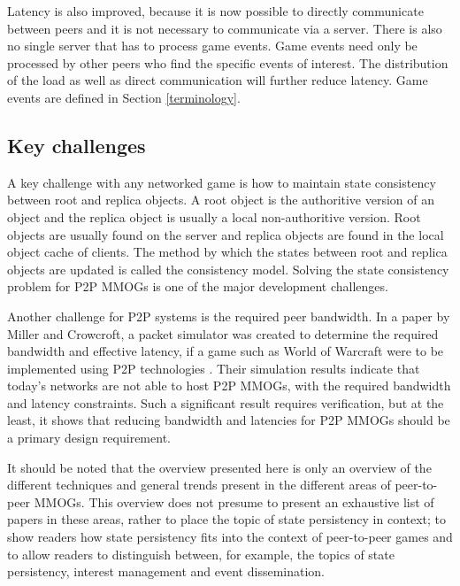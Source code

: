 Latency is also improved, because it is now possible to directly communicate between peers and it is not necessary to communicate via a server. There
is also no single server that has to process game events. Game events need only be processed by other peers who find the specific events of interest.
The distribution of the load as well as direct communication will further reduce latency. Game events are defined in Section \ref{terminology}.

\subsection{Key challenges}
\label{key_challenges}

A key challenge with any networked game is how to maintain state consistency between root and replica objects. A root object is the authoritive
version of an object and the replica object is usually a local non-authoritive version. Root objects are usually found on the server and replica
objects are found in the local object cache of clients. The method by which the states between root and replica objects are updated is called the
consistency model. Solving the state consistency problem for P2P MMOGs is one of the major development challenges.


Another challenge for P2P systems is the required peer bandwidth. In a paper by Miller and Crowcroft, a packet simulator was created to determine the
required bandwidth and effective latency, if a game such as World of Warcraft were to be implemented using P2P technologies
\cite{Miller_p2p_infeasability}. Their simulation results indicate that today's networks are not able to host P2P MMOGs, with the required bandwidth
and latency constraints. Such a significant result requires verification, but at the least, it shows that reducing bandwidth and latencies for P2P
MMOGs should be a primary design requirement.

It should be noted that the overview presented here is only an overview of the different techniques and general trends present in the different areas
of peer-to-peer MMOGs. This overview does not presume to present an exhaustive list of papers in these areas, rather to place the topic of state
persistency in context; to show readers how state persistency fits into the context of peer-to-peer games and to allow readers to distinguish
between, for example, the topics of state persistency, interest management and event dissemination.

